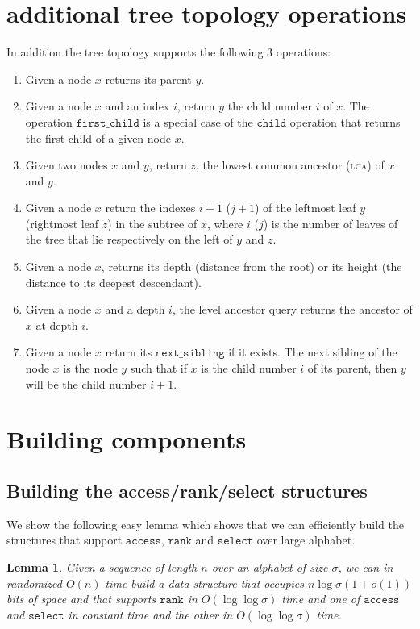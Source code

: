 \documentclass[a4paper]{article}
\newtheorem{lemma}{Lemma}
\begin{document}
\section{additional tree topology operations}
In addition the tree topology supports the following $3$ operations: 
\begin{enumerate}
\item Given a node $x$ returns its parent $y$.  
\item Given a node $x$ and an index $i$, return $y$ the child number 
$i$ of $x$. The operation $\mathtt{first\_child}$ is a special case 
of the $\mathtt{child}$ operation that returns the first child of a given node $x$. 
\item Given two nodes $x$ and $y$, return $z$, the lowest common ancestor
(\textsc{lca}) of $x$ and $y$. 
\item Given a node $x$ return the indexes $i+1$ ($j+1$) 
of the leftmost leaf $y$ (rightmost leaf $z$) 
in the subtree of $x$, where $i$ ($j$)
is the number of leaves of the tree that lie respectively 
on the left of $y$ and $z$. 

\item Given a node $x$, returns its depth (distance from the root) or 
its height (the distance to its deepest descendant). 
\item Given a node $x$ and a depth $i$, the level ancestor 
query returns the ancestor of $x$ at depth $i$. 
\item Given a node $x$ return its $\mathtt{next\_sibling}$ if it exists. 
The next sibling of the node $x$ is the node $y$ such that if $x$ is the 
child number $i$ of its parent, then $y$ will be the child number $i+1$. 
\end{enumerate}






\section{Building components}
\subsection{Building the access/rank/select structures}
\label{sec:build_rank}
We show the following easy lemma which shows that we can efficiently build the structures that support $\mathtt{access}$, $\mathtt{rank}$ and $\mathtt{select}$ over large alphabet. 
\begin{lemma}
\label{lemma:rank_select_access}
Given a sequence of length $n$ over an alphabet of size $\sigma$, we can in randomized $O(n)$ time build a data structure that occupies $n\log\sigma(1+o(1))$ bits of space and that supports $\mathtt{rank}$ in $O(\log\log\sigma)$ time and one of $\mathtt{access}$ and $\mathtt{select}$ in constant time and the other in $O(\log\log\sigma)$ time. 
\end{lemma}
\end{document}
